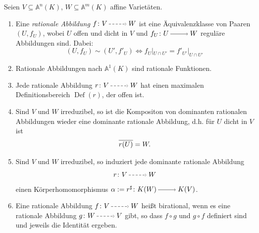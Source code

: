\documentclass[a4paper,12pt]{scrbook}
\def\A{\mathbb{A}}
\newcommand{\Def}{\operatorname{Def}}
\newcommand{\restrict}[1]{|_{#1}}
\newcommand{\ra}{\raisebox{-1pt}{\tikz{\draw[thin,shorten >=3pt, ->] (0,0) node{\hspace*{-2pt}} -- node{} (1,0);}}\penalty1000\relax}
\newcommand{\ppf}{\raisebox{-1pt}{\tikz{\draw[densely dashed,thin,shorten >=3pt, ->] (0,0) node{\hspace*{-2pt}} -- node{} (1,0);}}\penalty1000\relax}
\def\Bar#1{\ensuremath\overline{#1}}
\begin{document}
\begin{db}\label{1.6.5} Seien $V\subseteq \A^n(K)$, $W\subseteq \A^m(K)$ affine Varietäten.
  \begin{enumerate}
  \item\label{1.6.5a} Eine \emph{rationale Abbildung} $f \colon V\ppf W$ ist eine Äquivalenzklasse von Paaren $(U,f_U)$, wobei $U$ offen und dicht in $V$ und $f_U \colon U\ra W$ reguläre Abbildungen sind. Dabei:
  \[(U,f_U)\sim (U',f'_U) \iff f_U\restrict{U\cap U'}=f'_{U'}\restrict{U\cap U'}\]
  \item\label{1.6.5b} Rationale Abbildungen nach $\A^1(K)$ sind rationale Funktionen.
  \item\label{1.6.5c} Jede rationale Abbildung $r \colon V\ppf W$ hat einen maximalen Definitionsbereich $\Def(r)$, der offen ist.
  \item\label{1.6.5d} Sind $V$ und $W$ irreduzibel, so ist die Kompositon von dominanten rationalen Abbildungen wieder eine dominante rationale Abbildung, d.h. für $U$ dicht in $V$ ist \[\Bar{r(U)}=W.\]
  \item\label{1.6.5e} Sind $V$ und $W$ irreduzibel, so induziert jede dominante rationale Abbildung \[r \colon V\ppf W\] einen Körperhomomorphismus $\alpha:=r^{\sharp} \colon K(W)\ra K(V)$.
  \item\label{1.6.5f} Eine rationale Abbildung $f \colon V\ppf W$ heißt birational, wenn es eine rationale Abbildung $g \colon W\ppf V$ gibt, so dass $f\circ g$ und $g\circ f$ definiert sind und jeweils die Identität ergeben.
  \end{enumerate}
\end{db}
\end{document}
